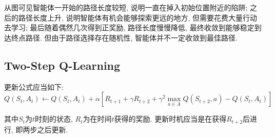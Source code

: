 从图可见智能体一开始的路径长度较短, 说明一直在掉入初始位置附近的陷阱; 之后的路径长度上升, 说明智能体有机会能够探索更远的地方, 但需要花费大量行动去学习; 最后随着偶然几次得到正奖励, 路径长度慢慢降低, 最终收敛到能够稳定到达终点路径. 但由于路径选择存在随机性, 智能体并不一定收敛到最佳路径.

\subsection{Two-Step Q-Learning}

更新公式应当如下: \begin{equation*}
    Q(S_t,A_t) \leftarrow Q(S_t,A_t) + \alpha \left[
        R_{t+1} + \gamma R_{t+2} + \gamma^2 \max_{a\in A} Q(S_{t+2}, a) - Q(S_t,A_t)
    \right]
\end{equation*}

其中$S_t$为$t$时刻的状态, $R_t$为在时间$t$获得的奖励. 更新时机应当是在获得$R_{t+2}$后进行, 即两步之后更新.
